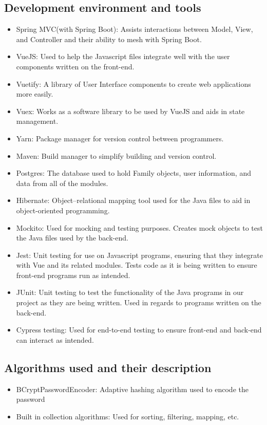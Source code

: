 \documentclass[12pt]{article}
\begin{document}
\subsection{Development environment and tools}
\begin{itemize}
    \item Spring MVC(with Spring Boot): Assists interactions between Model, View, and Controller and their ability to mesh with Spring Boot. 
    \item VueJS: Used to help the Javascript files integrate well with the user components written on the front-end. 
    \item Vuetify: A library of User Interface components to create web applications more easily. 
    \item Vuex: Works as a software library to be used by VueJS and aids in state management. 
    \item Yarn: Package manager for version control between programmers.
    \item Maven: Build manager to simplify building and version control. 
    \item Postgres: The database used to hold Family objects, user information, and data from all of the modules. 
    \item Hibernate:  Object–relational mapping tool used for the Java files to aid in object-oriented programming. 
    \item Mockito: Used for mocking and testing purposes. Creates mock objects to test the Java files used by the back-end.
    \item Jest: Unit testing for use on Javascript programs, ensuring that they integrate with Vue and its related modules. Tests code as it is being written to ensure front-end programs run as intended. 
    \item JUnit: Unit testing to test the functionality of the Java programs in our project as they are being written. Used in regards to programs written on the back-end. 
    \item Cypress testing: Used for end-to-end testing to ensure front-end and back-end can interact as intended. 
\end{itemize}

\subsection{Algorithms used and their description}
\begin{itemize}
    \item BCryptPasswordEncoder: Adaptive hashing algorithm used to encode the password
    \item Built in collection algorithms: Used for sorting, filtering, mapping, etc.
\end{itemize}
\end{document}
